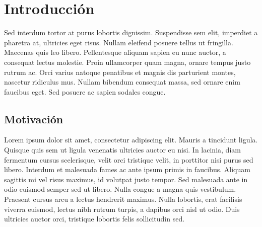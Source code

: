\chapter{Introducción}

Sed interdum tortor at purus lobortis dignissim. Suspendisse sem elit, imperdiet a pharetra at, ultricies eget risus. Nullam eleifend posuere tellus ut fringilla. Maecenas quis leo libero. Pellentesque aliquam sapien eu nunc auctor, a consequat lectus molestie. Proin ullamcorper quam magna, ornare tempus justo rutrum ac. Orci varius natoque penatibus et magnis dis parturient montes, nascetur ridiculus mus. Nullam bibendum consequat massa, sed ornare enim faucibus eget. Sed posuere ac sapien sodales congue.  

\section{Motivación}

Lorem ipsum dolor sit amet, consectetur adipiscing elit. Mauris a tincidunt ligula. Quisque quis sem ut ligula venenatis ultricies auctor eu nisi. In lacinia, diam fermentum cursus scelerisque, velit orci tristique velit, in porttitor nisi purus sed libero. Interdum et malesuada fames ac ante ipsum primis in faucibus. Aliquam sagittis mi vel risus maximus, id volutpat justo tempor. Sed malesuada ante in odio euismod semper sed ut libero. Nulla congue a magna quis vestibulum. Praesent cursus arcu a lectus hendrerit maximus. Nulla lobortis, erat facilisis viverra euismod, lectus nibh rutrum turpis, a dapibus orci nisl ut odio. Duis ultricies auctor orci, tristique lobortis felis sollicitudin sed. 





